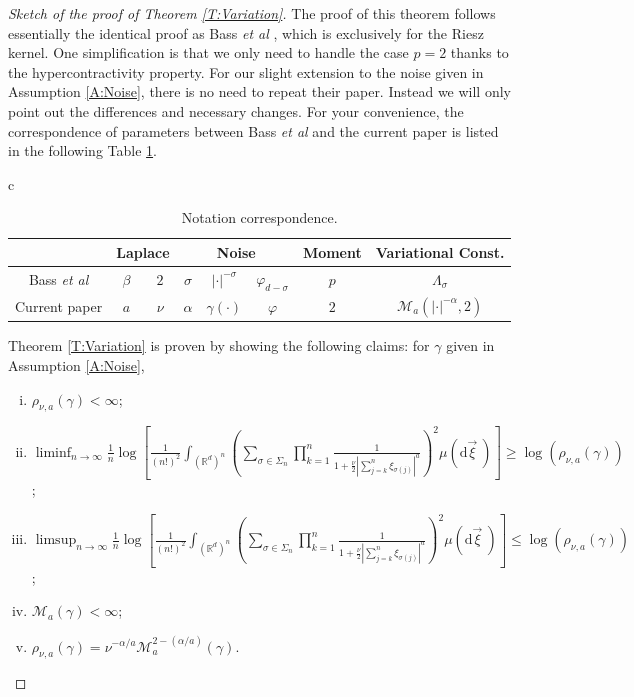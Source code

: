 \documentclass[a4paper,11pt]{article}
\numberwithin{equation}{section}
\numberwithin{equation}{section}
\theoremstyle{plain}
\theoremstyle{definition}
\newcommand{\ud}{\ensuremath{\mathrm{d} }}
\newcommand{\R}{\mathbb{R}}
\begin{document}
\begin{proof}[Sketch of the proof of Theorem \ref{T:Variation}]
  The proof of this theorem follows essentially the identical proof as Bass {\it et al}
  \cite{BCR09}, which is exclusively for the Riesz kernel. One simplification is that we only need
  to handle the case $p=2$ thanks to the hypercontractivity property. For our slight extension to
  the noise given in Assumption \ref{A:Noise}, there is no need to repeat their paper. Instead we
  will only point out the differences and necessary changes. For your convenience, the
  correspondence of parameters between Bass {\it et al} \cite{BCR09} and the current paper is listed
  in the following Table \ref{Tb:Notation}.

  \begin{table}[htpb]
    \centering
    \caption{Notation correspondence.}
    \label{Tb:Notation}
    \renewcommand{\arraystretch}{1.2}
    \begin{tabular}{c}
  \renewcommand{\arraystretch}{1.2}
  \begin{tabular}{|c|c|c|c|c|c|c|c|}
    \hline
                                  & \multicolumn{2}{c|}{Laplace} & \multicolumn{3}{c|}{Noise} & Moment   & Variational Const.  \\ \hline
    Bass {\it et al} \cite{BCR09} & $\beta$                      & $2$                        & $\sigma$ & $|\cdot|^{-\sigma}$  & $\varphi_{d-\sigma}$ & $p$ & $\Lambda_\sigma$                                \\
    Current paper                 & $a$                          & $\nu$                      & $\alpha$ & $\gamma(\cdot)$      & $\varphi$            & $2$ & $\mathcal{M}_a\left(|\cdot|^{-\alpha},2\right)$ \\ \hline
  \end{tabular}
    \end{tabular}
  \end{table}


  Theorem  \ref{T:Variation} is proven by showing the following claims: for $\gamma$ given in
  Assumption  \ref{A:Noise},
  \begin{enumerate}[(i)]
    \item $\rho_{\nu,a}(\gamma)<\infty$;
    \item $\liminf_{n \to \infty} \frac{1}{n} \log \left[ \frac{1}{(n!)^2} \int_{(\R^d)^n} \left( \sum_{\sigma \in \Sigma_n} \prod_{k=1}^n \frac{1}{1+ \frac{\nu}{2}|\sum_{j=k}^n \xi_{\sigma(j)}|^a}\right)^2 \mu (\ud \vec{\xi}\:)\right] \ge \log\left( \rho_{\nu, a}\left(\gamma\right) \right)$;
    \item $\limsup_{n \to \infty} \frac{1}{n} \log \left[ \frac{1}{(n!)^2} \int_{(\R^d)^n} \left( \sum_{\sigma \in \Sigma_n} \prod_{k=1}^n \frac{1}{1+ \frac{\nu}{2}|\sum_{j=k}^n \xi_{\sigma(j)}|^a}\right)^2 \mu (\ud \vec{\xi}\:)\right] \le \log\left( \rho_{\nu, a}\left(\gamma\right) \right)$;
    \item $\mathcal{M}_{a}(\gamma)<\infty$;
    \item $\rho_{\nu,a}(\gamma) = \nu^{-\alpha/a} \mathcal{M}_a^{2-(\alpha / a)}(\gamma)$.
  \end{enumerate}


\end{proof}
\end{document}
